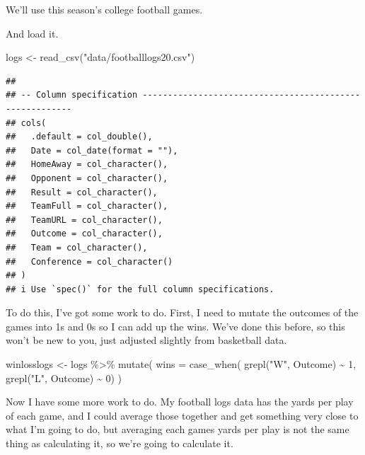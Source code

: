 \documentclass[
]{book}
\newenvironment{Shaded}{\begin{snugshade}}{\end{snugshade}}
\newcommand{\AttributeTok}[1]{\textcolor[rgb]{0.77,0.63,0.00}{#1}}
\newcommand{\DecValTok}[1]{\textcolor[rgb]{0.00,0.00,0.81}{#1}}
\newcommand{\FunctionTok}[1]{\textcolor[rgb]{0.00,0.00,0.00}{#1}}
\newcommand{\NormalTok}[1]{#1}
\newcommand{\OtherTok}[1]{\textcolor[rgb]{0.56,0.35,0.01}{#1}}
\newcommand{\SpecialCharTok}[1]{\textcolor[rgb]{0.00,0.00,0.00}{#1}}
\newcommand{\StringTok}[1]{\textcolor[rgb]{0.31,0.60,0.02}{#1}}
\begin{document}
We'll use this season's college football games.

And load it.

\begin{Shaded}
\begin{Highlighting}[]
\NormalTok{logs }\OtherTok{\textless{}{-}} \FunctionTok{read\_csv}\NormalTok{(}\StringTok{"data/footballlogs20.csv"}\NormalTok{)}
\end{Highlighting}
\end{Shaded}

\begin{verbatim}
## 
## -- Column specification --------------------------------------------------------
## cols(
##   .default = col_double(),
##   Date = col_date(format = ""),
##   HomeAway = col_character(),
##   Opponent = col_character(),
##   Result = col_character(),
##   TeamFull = col_character(),
##   TeamURL = col_character(),
##   Outcome = col_character(),
##   Team = col_character(),
##   Conference = col_character()
## )
## i Use `spec()` for the full column specifications.
\end{verbatim}

To do this, I've got some work to do. First, I need to mutate the outcomes of the games into 1s and 0s so I can add up the wins. We've done this before, so this won't be new to you, just adjusted slightly from basketball data.

\begin{Shaded}
\begin{Highlighting}[]
\NormalTok{winlosslogs }\OtherTok{\textless{}{-}}\NormalTok{ logs }\SpecialCharTok{\%\textgreater{}\%} 
  \FunctionTok{mutate}\NormalTok{(}
    \AttributeTok{wins =} \FunctionTok{case\_when}\NormalTok{(}
      \FunctionTok{grepl}\NormalTok{(}\StringTok{"W"}\NormalTok{, Outcome) }\SpecialCharTok{\textasciitilde{}} \DecValTok{1}\NormalTok{, }
      \FunctionTok{grepl}\NormalTok{(}\StringTok{"L"}\NormalTok{, Outcome) }\SpecialCharTok{\textasciitilde{}} \DecValTok{0}\NormalTok{)}
\NormalTok{)}
\end{Highlighting}
\end{Shaded}

Now I have some more work to do. My football logs data has the yards per play of each game, and I could average those together and get something very close to what I'm going to do, but averaging each games yards per play is not the same thing as calculating it, so we're going to calculate it.
\end{document}
